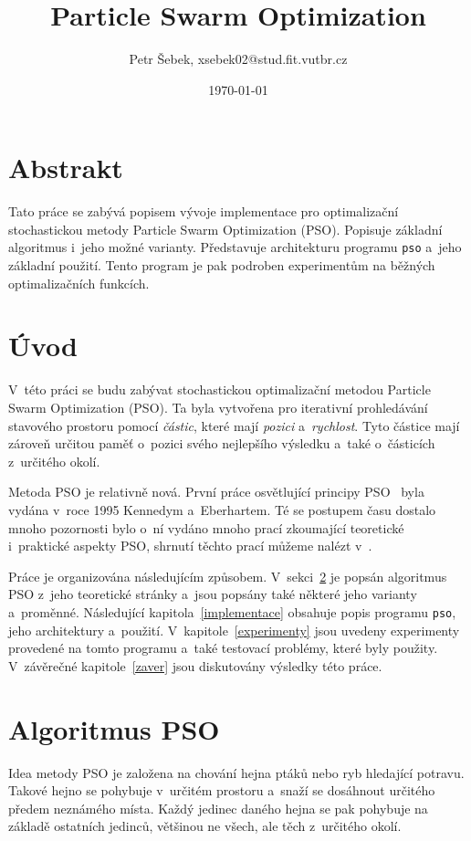 \documentclass[12pt,a4paper,fleqn]{article}
\title{Particle Swarm Optimization}
\author{Petr Šebek, xsebek02@stud.fit.vutbr.cz}
\date{\today}
\begin{document}
\maketitle

\section*{Abstrakt}
Tato práce se zabývá popisem vývoje implementace pro optimalizační stochastickou metody Particle Swarm Optimization (PSO). Popisuje základní algoritmus i~jeho možné varianty. Představuje architekturu programu \texttt{pso} a~jeho základní použití. Tento program je pak podroben experimentům na běžných optimalizačních funkcích.


\section{Úvod}
V~této práci se budu zabývat stochastickou optimalizační metodou Particle Swarm  Optimization (PSO). 
Ta byla vytvořena pro iterativní prohledávání stavového prostoru pomocí \textit{částic}, které mají \textit{pozici} a~\textit{rychlost}. Tyto částice mají zároveň určitou paměť o~pozici svého nejlepšího výsledku a~také o~částicích z~určitého okolí.

Metoda PSO je relativně nová. První práce osvětlující principy PSO~\cite{eberhat1995particle} byla vydána v~roce 1995 Kennedym a~Eberhartem. Té se postupem času dostalo mnoho pozornosti bylo o~ní vydáno mnoho prací zkoumající teoretické i~praktické aspekty PSO, shrnutí těchto prací můžeme nalézt v~\cite{poli2007particle}.

Práce je organizována následujícím způsobem. V~sekci~\ref{algoritmus_pso} je popsán algoritmus PSO z~jeho teoretické stránky a~jsou popsány také některé jeho varianty a~proměnné. Následující kapitola~\ref{implementace} obsahuje popis programu \texttt{pso}, jeho architektury a~použití. V~kapitole~\ref{experimenty} jsou uvedeny experimenty provedené na tomto programu a~také testovací problémy, které byly použity. V~závěrečné kapitole~\ref{zaver} jsou diskutovány výsledky této práce.

\newpage
\section{Algoritmus PSO} \label{algoritmus_pso}
Idea metody PSO je založena na chování hejna ptáků nebo ryb hledající potravu. Takové hejno se pohybuje v~určitém prostoru a~snaží se dosáhnout určitého předem neznámého místa. Každý jedinec daného hejna se pak pohybuje na základě ostatních jedinců, většinou ne všech, ale těch z~určitého okolí.
\end{document}
